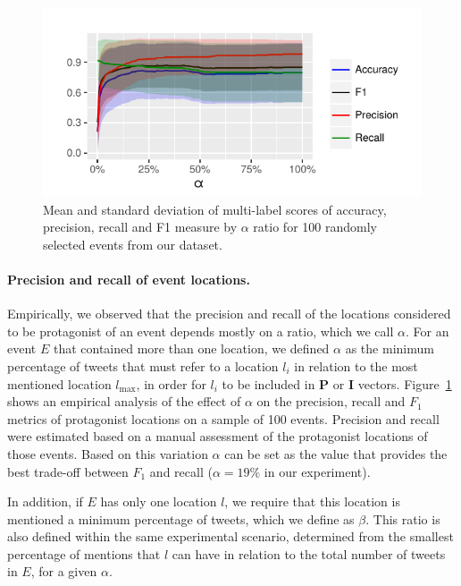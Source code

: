 \begin{figure}[h]
  \centering
  \includegraphics[width=\textwidth]{figures/geopolitical/k_accuracy_recall.pdf}
  \caption[Mean and standard deviation of multi-label scores]{Mean and standard
  deviation of multi-label scores of accuracy, precision, recall and F1 measure
  by $\alpha$ ratio for 100 randomly selected events from our dataset.}
  \label{fig:eval}
\end{figure}

\medskip
\paragraph{Precision and recall of event locations.}
%
Empirically, we observed that the precision and recall of the locations
considered to be protagonist of an event depends mostly on a ratio, which we
call $\alpha$.
%
For an event $E$ that contained more than one location, we defined $\alpha$ as
the minimum percentage of tweets that must refer to a location $l_i$ in relation
to the most mentioned location $l_{\mathrm{max}}$, in order for $l_i$ to be
included in $\mathbf{P}$ or $\mathbf{I}$ vectors.
%
Figure~\ref{fig:eval} shows an empirical analysis of the effect of $\alpha$ on
the precision, recall and $F_1$ metrics of protagonist locations on a sample of
100 events.  
%
Precision and recall were estimated based on a manual assessment of the
protagonist locations of those events. 
%
Based on this variation $\alpha$ can be set as the value that provides the best
trade-off between $F_1$ and recall ($\alpha = 19\%$ in our experiment).

In addition, if $E$ has only one location $l$, we require that this location is
mentioned a minimum percentage of tweets, which we define as $\beta$. This ratio
is also defined within the same experimental scenario, determined from the
smallest percentage of mentions that $l$ can have in relation to the total
number of tweets in $E$, for a given $\alpha$.



